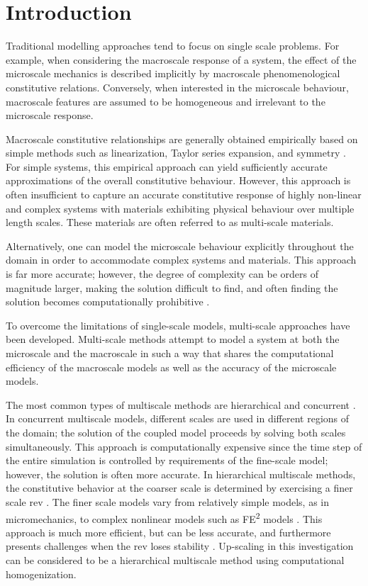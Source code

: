\chapter{Introduction}
Traditional modelling approaches tend to focus on single scale problems. For example, when considering the macroscale response of a system, the effect of the microscale mechanics is described implicitly by macroscale phenomenological constitutive relations. Conversely, when interested in the microscale behaviour, macroscale features are assumed to be homogeneous and irrelevant to the microscale response. 

Macroscale constitutive relationships are generally obtained empirically based on simple methods such as linearization, Taylor series expansion, and symmetry \citep{weinan_principles_2011}. For simple systems, this empirical approach can yield sufficiently accurate approximations of the overall constitutive behaviour. However, this approach is often insufficient to capture an accurate constitutive response of highly non-linear and complex systems with materials exhibiting physical behaviour over multiple length scales. These materials are often referred to as multi-scale materials. 

Alternatively, one can model the microscale behaviour explicitly throughout the domain in order to accommodate complex systems and materials. This approach is far more accurate; however, the degree of complexity can be orders of magnitude larger, making the solution difficult to find, and often finding the solution becomes computationally prohibitive \citep{xu_multicale_2002}.

To overcome the limitations of single-scale models, multi-scale approaches have been developed. Multi-scale methods attempt to model a system at both the microscale and the macroscale in such a way that shares the computational efficiency of the macroscale models as well as the accuracy of the microscale models.

The most common types of multiscale methods are hierarchical and concurrent \citep{Gracie_2011}. In concurrent multiscale models, different scales are used in different regions of the domain; the solution of the coupled model proceeds by solving both scales simultaneously. This approach is computationally expensive since the time step of the entire simulation is controlled by requirements of the fine-scale model; however, the solution is often more accurate.  In hierarchical multiscale methods, the constitutive behavior at the coarser scale is determined by exercising a finer scale \acrfull{rev} \citep{Li_2014}. The finer scale models vary from relatively simple models, as in micromechanics, to complex nonlinear models such as FE\textsuperscript{2} models \citep{Feyel_2003}. This approach is much more efficient, but can be less accurate, and furthermore  presents challenges when the \acrshort{rev} loses stability \citep{Belytschko_2008}. Up-scaling in this investigation can be considered to be a hierarchical multiscale method using computational homogenization. 

